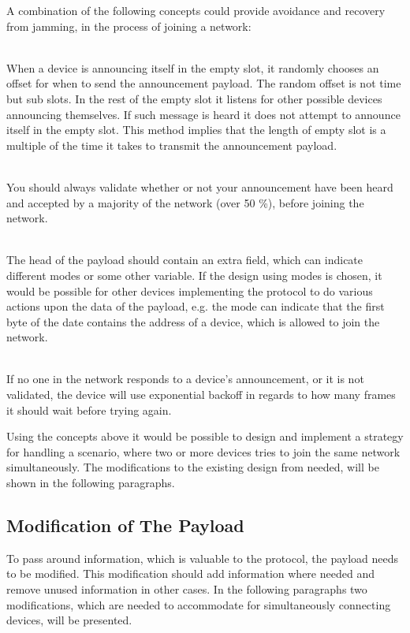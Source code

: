 A combination of the following concepts could provide avoidance and recovery from jamming, in the process of joining a network: 
\begin{description}[labelindent=\parindent]
    \item[Random Offset]\hfill\\
    When a device is announcing itself in the empty slot, it randomly chooses an offset for when to send the announcement payload.
    The random offset is not time but sub slots. 
    In the rest of the empty slot it listens for other possible devices announcing themselves.
    If such message is heard it does not attempt to announce itself in the empty slot.
    This method implies that the length of empty slot is a multiple of the time it takes to transmit the announcement payload.
    \item[Validation]\hfill\\
    You should always validate whether or not your announcement have been heard and accepted by a majority of the network (over 50 \%), before joining the network.
    \item[Payload Mode]\hfill\\
    The head of the payload should contain an extra field, which can indicate different modes or some other variable.
    If the design using modes is chosen, it would be possible for other devices implementing the protocol to do various actions upon the data of the payload, e.g. the mode can indicate that the first byte of the date contains the address of a device, which is allowed to join the network.
    \item[Exponential Backoff]\hfill\\ 
    If no one in the network responds to a device's announcement, or it is not validated, the device will use exponential backoff in regards to how many frames it should wait before trying again.
\end{description} 
\noindent
Using the concepts above it would be possible to design and implement a strategy for handling a scenario, where two or more devices tries to join the same network simultaneously.
The modifications to the existing design from  needed, will be shown in the following paragraphs.

\subsection{Modification of The Payload} %
\label{sub:modification_of_the_payload}
To pass around information, which is valuable to the protocol, the payload needs to be modified.
This modification should add information where needed and remove unused information in other cases.
In the following paragraphs two modifications, which are needed to accommodate for simultaneously connecting devices, will be presented. 

